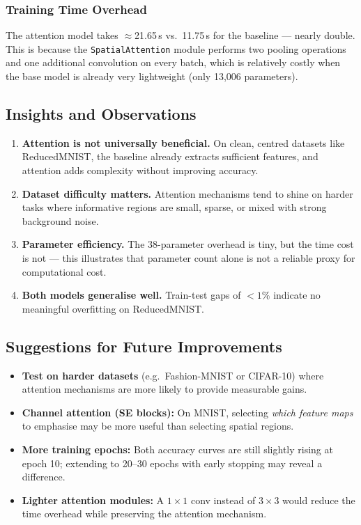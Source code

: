 \documentclass[12pt,a4paper]{article}
\begin{document}
\subsubsection{Training Time Overhead}

The attention model takes $\approx$21.65\,s vs.\ 11.75\,s for the baseline — nearly
double. This is because the \texttt{SpatialAttention} module performs two pooling
operations and one additional convolution on every batch, which is relatively costly
when the base model is already very lightweight (only 13,006 parameters).

\subsection{Insights and Observations}

\begin{enumerate}[leftmargin=1.5em]
    \item \textbf{Attention is not universally beneficial.} On clean, centred datasets
          like ReducedMNIST, the baseline already extracts sufficient features, and
          attention adds complexity without improving accuracy.
    \item \textbf{Dataset difficulty matters.} Attention mechanisms tend to shine on
          harder tasks where informative regions are small, sparse, or mixed with
          strong background noise.
    \item \textbf{Parameter efficiency.} The 38-parameter overhead is tiny, but the
          time cost is not — this illustrates that parameter count alone is not a
          reliable proxy for computational cost.
    \item \textbf{Both models generalise well.} Train-test gaps of $<1\%$ indicate
          no meaningful overfitting on ReducedMNIST.
\end{enumerate}

\subsection{Suggestions for Future Improvements}

\begin{itemize}[leftmargin=1.5em]
    \item \textbf{Test on harder datasets} (e.g.\ Fashion-MNIST or CIFAR-10) where
          attention mechanisms are more likely to provide measurable gains.
    \item \textbf{Channel attention (SE blocks):} On MNIST, selecting \emph{which
          feature maps} to emphasise may be more useful than selecting spatial regions.
    \item \textbf{More training epochs:} Both accuracy curves are still slightly
          rising at epoch 10; extending to 20--30 epochs with early stopping may
          reveal a difference.
    \item \textbf{Lighter attention modules:} A $1\times1$ conv instead of $3\times3$
          would reduce the time overhead while preserving the attention mechanism.
\end{itemize}
\end{document}
